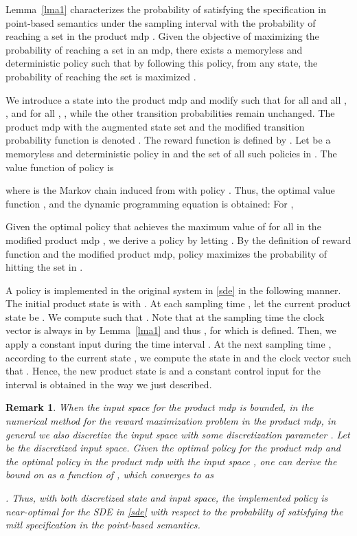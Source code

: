 \documentclass[letterpaper, 10 pt, conference]{ieeeconf}
\newtheorem{remark}{Remark}
\begin{document}
Lemma~\ref{lma1} characterizes the probability of satisfying the
specification in point-based semantics under the sampling interval
 with the probability of reaching a set  in the product
\ac{mdp} . Given the objective of maximizing the probability of
reaching a set in an \ac{mdp}, there exists a memoryless
and deterministic policy such that by following this policy, from any
state, the probability of reaching the set is maximized
\cite{Baier2008}.

We introduce a state  into the product \ac{mdp}  and
modify  such that for all  and all ,
, and for all ,
, while the other transition probabilities
remain unchanged. The product \ac{mdp}  with the augmented
state set and the modified transition probability function is denoted
.  The reward function
 is defined by
.  Let  be a
memoryless and deterministic policy in  and  the
set of all such policies in .  The value function of
policy  is

where  is the Markov chain induced from
 with policy .  Thus, the optimal value function
, and the dynamic programming
equation is obtained: For ,




Given the optimal policy
 that achieves the
maximum value of  for all  in the modified product
\ac{mdp} , we derive a policy 
by letting . By the definition of reward
function and the modified product \ac{mdp}, policy  maximizes
the probability of hitting the set  in .

A policy  is implemented in the original system in
\eqref{sde} in the following manner. The initial product state is
 with
. At each sampling
time , let the current product state be
. We compute  such that
. Note that at the sampling time the clock vector is
always in  by Lemma~\ref{lma1} and thus
, for which  is defined. Then, we apply a
constant input  during the time interval
. At the next sampling time ,
according to the current state , we compute the state in
 and the clock vector such that
.  Hence, the new product
state is  and a constant control input for the interval
 is obtained in the way we just described.




\begin{remark}
  When the input space  for the product \ac{mdp} is bounded, in the
  numerical method for the reward maximization problem in the product
  \ac{mdp}, in general we also discretize the input space  with
  some discretization parameter . Let  be the
  discretized input space. Given the optimal policy  for the
  product \ac{mdp} and the optimal policy  in the
  product \ac{mdp} with the input space , one can derive
  the bound on 
  as a function of , which converges to  as
  
  \cite{fleming2006controlled,kushner2001numerical}.  Thus, with both
  discretized state and input space, the implemented policy is
  near-optimal for the SDE in \eqref{sde} with respect to the
  probability of satisfying the \ac{mitl} specification in the
  point-based semantics.
\end{remark}
\end{document}
